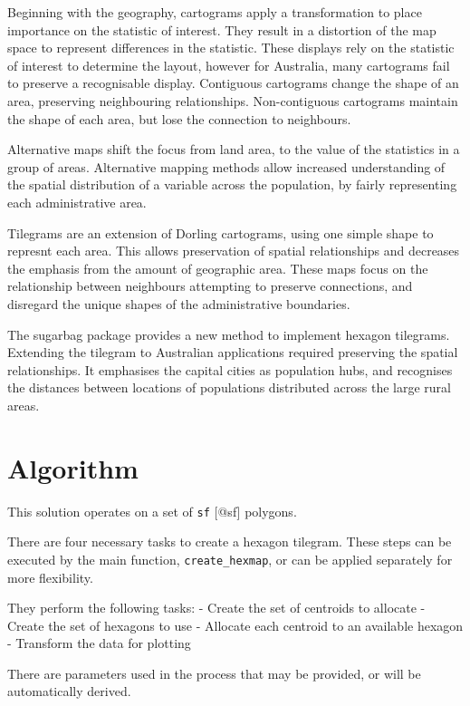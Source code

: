 Beginning with the geography, cartograms apply a transformation to place
importance on the statistic of interest. They result in a distortion of
the map space to represent differences in the statistic. These displays
rely on the statistic of interest to determine the layout, however for
Australia, many cartograms fail to preserve a recognisable display.
Contiguous cartograms change the shape of an area, preserving
neighbouring relationships. Non-contiguous cartograms maintain the shape
of each area, but lose the connection to neighbours.

Alternative maps shift the focus from land area, to the value of the
statistics in a group of areas. Alternative mapping methods allow
increased understanding of the spatial distribution of a variable across
the population, by fairly representing each administrative area.

Tilegrams are an extension of Dorling cartograms, using one simple shape
to represnt each area. This allows preservation of spatial relationships
and decreases the emphasis from the amount of geographic area. These
maps focus on the relationship between neighbours attempting to preserve
connections, and disregard the unique shapes of the administrative
boundaries.

The sugarbag package provides a new method to implement hexagon
tilegrams. Extending the tilegram to Australian applications required
preserving the spatial relationships. It emphasises the capital cities
as population hubs, and recognises the distances between locations of
populations distributed across the large rural areas.

\hypertarget{algorithm}{%
\section{Algorithm}\label{algorithm}}

This solution operates on a set of \texttt{sf} {[}@sf{]} polygons.

There are four necessary tasks to create a hexagon tilegram. These steps
can be executed by the main function, \texttt{create\_hexmap}, or can be
applied separately for more flexibility.

They perform the following tasks: - Create the set of centroids to
allocate - Create the set of hexagons to use - Allocate each centroid to
an available hexagon - Transform the data for plotting

There are parameters used in the process that may be provided, or will
be automatically derived.

